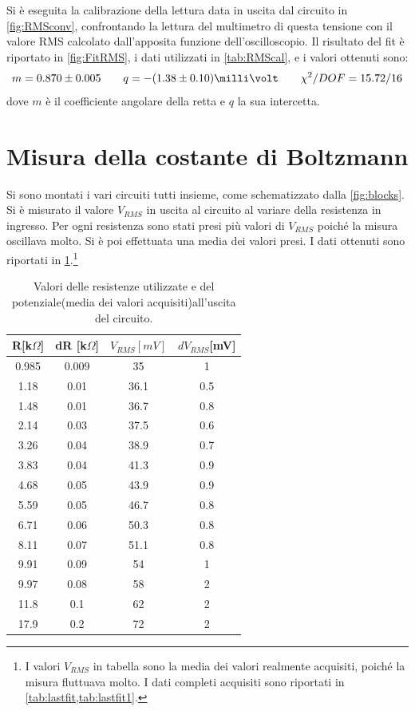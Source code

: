 \documentclass[a4paper,10pt]{article}
\begin{document}
Si è eseguita la calibrazione della lettura data in uscita dal circuito in \cref{fig:RMSconv}, confrontando la lettura del multimetro di questa tensione con il valore RMS calcolato dall'apposita funzione dell'oscilloscopio.
Il risultato del fit è riportato in \cref{fig:FitRMS}, i dati utilizzati in \cref{tab:RMScal}, e i valori ottenuti sono:
\[ m = 0.870 \pm 0.005	\qquad	q = -(1.38\pm0.10) \milli\volt	\qquad	\chi^2/DOF = 15.72 / 16 \]
dove $ m $ è il coefficiente angolare della retta e $ q $ la sua intercetta.


\section{Misura della costante di Boltzmann}
\vspace*{-5pt}
Si sono montati i vari circuiti tutti insieme, come schematizzato dalla \cref{fig:blocks}. Si è misurato il valore $V_{RMS}$ in uscita al circuito al variare della resistenza in ingresso. Per ogni resistenza sono stati presi più valori di $V_{RMS}$ poiché la misura oscillava molto. Si è poi effettuata una media dei valori presi. I dati ottenuti sono riportati in \cref{tab:lastfitav}.\footnote{I valori $V_{RMS}$ in tabella sono la media dei valori realmente acquisiti, poiché la misura fluttuava molto. I dati completi acquisiti sono riportati in \cref{tab:lastfit,tab:lastfit1}.}
\vspace*{-10pt}
\begin{table}[H]
	\centering
	\begin{tabular}{cccc}
		\hline
		R[k$\Omega$] & dR [k$\Omega$] & $V_{RMS}[mV]$  & $dV_{RMS}$[mV] \\
		\hline
		0.985 & 0.009 & 35 & 1 \\
		1.18 & 0.01 & 36.1 & 0.5 \\
		1.48 & 0.01 & 36.7 & 0.8 \\
		2.14 & 0.03 & 37.5 & 0.6 \\
		3.26 & 0.04 & 38.9 & 0.7 \\
		3.83 & 0.04 & 41.3 & 0.9 \\
		4.68 & 0.05 & 43.9 & 0.9 \\
		5.59 & 0.05 & 46.7 & 0.8 \\
		6.71 & 0.06 & 50.3 & 0.8 \\
		8.11 & 0.07 & 51.1 & 0.8 \\
		9.91 & 0.09 & 54 & 1 \\
		9.97 & 0.08 & 58 & 2 \\
		11.8 & 0.1 & 62 & 2 \\
		17.9 & 0.2 & 72 & 2 \\
		\hline
	\end{tabular}
	\caption{Valori delle resistenze utilizzate e del potenziale(media dei valori acquisiti)all'uscita del circuito.}
	\label{tab:lastfitav}
\end{table}
\end{document}
